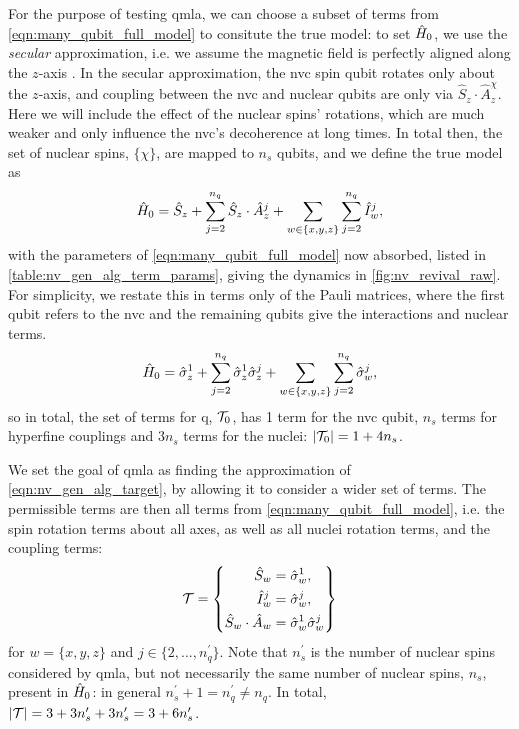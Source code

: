 For the purpose of testing \gls{qmla}, we can choose a subset of terms from \cref{eqn:many_qubit_full_model} to 
    consitute the \gls{true model}: to set $\hat{H}_0$, we use the \emph{secular} approximation, 
    i.e. we assume the magnetic field is perfectly aligned along the $z$-axis \cite{rowan1965electron}.
In the secular approximation, the \gls{nvc} spin qubit rotates only about the $z$-axis, 
    and coupling between the \gls{nvc} and nuclear qubits are only via $\hat{S}_z \cdot \hat{A}_z^{\chi}$.
Here we will include the effect of the nuclear spins' rotations, which are much weaker and only influence the \gls{nvc}'s decoherence at long times. 
In total then, the set of nuclear spins, $\{\chi\}$, are mapped to $n_s$ qubits, 
    and we define the \gls{true model} as 
\begin{equation}
    \hat{H}_0 = \hat{S}_z 
    + \sum\limits_{ j=2 }^{n_q} \hat{S}_z \cdot \hat{A}_z^{j} 
    + \sum\limits_{w \in \{x,y,z\}} \sum\limits_{ j=2 }^{n_q} \hat{I}_w^{j},
\end{equation}
    with the parameters of \cref{eqn:many_qubit_full_model} now absorbed, listed in \cref{table:nv_gen_alg_term_params}, 
    giving the dynamics in \cref{fig:nv_revival_raw}.
For simplicity, we restate this in terms only of the Pauli matrices,
    where the first qubit refers to the \gls{nvc} and the remaining qubits give the interactions and nuclear terms.
\begin{equation}
    \label{eqn:nv_gen_alg_target}
    \hat{H}_0 = \hat{\sigma}_{z}^1 
    + \sum\limits_{ j=2 }^{n_q} \hat{\sigma}_{z}^1 \hat{\sigma}_{z}^j 
    + \sum\limits_{w \in \{x,y,z\}} \sum\limits_{ j=2 }^{n_q} \hat{\sigma}_w^j,
\end{equation}
    so in total, the set of terms for \gls{q}, $\mathcal{T}_0$, has 1 term for the \gls{nvc} qubit, $n_s$ terms for hyperfine couplings
    and $3n_s$ terms for the nuclei: $\left\lvert \mathcal{T}_0 \right\rvert = 1 + 4n_s$.
\par 

We set the goal of \gls{qmla} as finding the approximation of \cref{eqn:nv_gen_alg_target},
    by allowing it to consider a wider set of terms. 
The permissible terms are then all terms from \cref{eqn:many_qubit_full_model}, 
    i.e. the spin rotation terms about all axes, 
    as well as all nuclei rotation terms, and the coupling terms:
\begin{equation}
    \mathcal{T} = \left\{ 
        \begin{split}    
            \hat{S}_w &= \hat{\sigma}_w^{1}, \\
            \hat{I}_w^{j} &= \hat{\sigma}_w^{j}, \\
            \hat{S}_w \cdot \hat{A}_w &= \hat{\sigma}_w^1 \hat{\sigma}_w^j
        \end{split}
    \right\}
    \label{eqn:nv_ga_terms}
\end{equation}
    for $w=\{ x, y, z \}$ and $j \in \{ 2, ..., n_q^{\prime} \}$.
Note that $n_s^{\prime}$ is the number of nuclear spins considered by \gls{qmla}, but not necessarily the 
    same number of nuclear spins, $n_s$, present in $\hat{H}_0$:
    in general $n_s^{\prime}+1 = n_q^{\prime} \neq n_q$.
In total, $\left\lvert \mathcal{T} \right\rvert = 3 + 3n_s^{\prime} + 3 n_s^{\prime} = 3 + 6 n_s^{\prime}$. 

